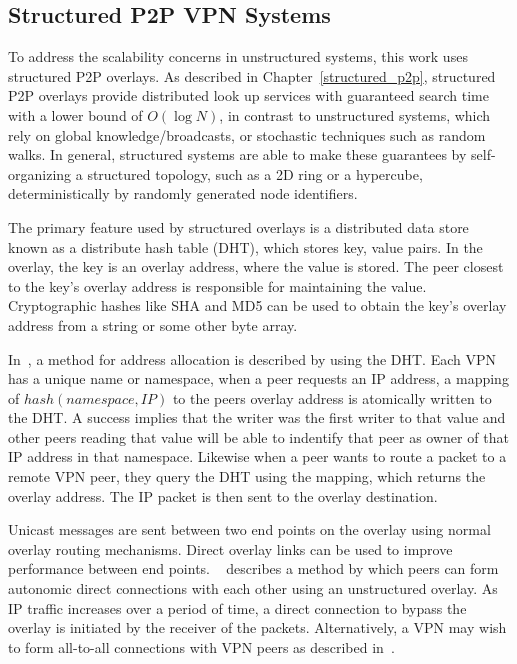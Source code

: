 \subsection{Structured P2P VPN Systems}
To address the scalability concerns in unstructured systems, this work uses
structured P2P overlays.  As described in Chapter~\ref{structured_p2p},
structured P2P overlays provide distributed look up services with guaranteed
search time with a lower bound of $O(\log N)$, in contrast to unstructured
systems, which rely on global knowledge/broadcasts, or stochastic techniques
such as random walks.  In general, structured systems are able to make these
guarantees by self-organizing a structured topology, such as a 2D ring or a
hypercube, deterministically by randomly generated node identifiers.

The primary feature used by structured overlays is a distributed data store
known as a distribute hash table (DHT), which stores key, value pairs.  In
the overlay, the key is an overlay address, where the value is stored.  The
peer closest to the key's overlay address is responsible for maintaining the
value.  Cryptographic hashes like SHA and MD5 can be used to obtain the key's
overlay address from a string or some other byte array.

In~\cite{pcgrid07, i3}, a method for address allocation is described by using
the DHT.  Each VPN has a unique name or namespace, when a peer requests an
IP address, a mapping of $hash(namespace, IP)$ to the peers overlay address
is atomically written to the DHT.  A success implies that the writer was the
first writer to that value and other peers reading that value will be able to
indentify that peer as owner of that IP address in that namespace.  Likewise
when a peer wants to route a packet to a remote VPN peer, they query the DHT
using the mapping, which returns the overlay address.  The IP packet is then
sent to the overlay destination.

Unicast messages are sent between two end points on the overlay using normal
overlay routing mechanisms.  Direct overlay links can be used to improve
performance between end points.  ~\cite{ipop} describes a method by which peers
can form autonomic direct connections with each other using an unstructured
overlay.  As IP traffic increases over a period of time, a direct connection to
bypass the overlay is initiated by the receiver of the packets.  Alternatively,
a VPN may wish to form all-to-all connections with VPN peers as described
in~\cite{cops08}.

